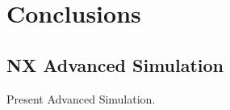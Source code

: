 
\chapter{Conclusions} %
\label{sec:conclusions}

\section{NX Advanced Simulation} %
\label{sub:nx_advanced_simulation}
Present Advanced Simulation.




